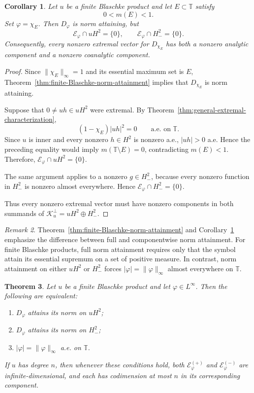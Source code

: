 \documentclass[12pt]{amsart}
\newtheorem{theorem}{Theorem}[section]
\newtheorem{corollary}[theorem]{Corollary}
\theoremstyle{definition}
\theoremstyle{remark}
\newtheorem{remark}[theorem]{Remark}
\def \T{\mathbb{T}}
\newcommand{\cle}{\mathcal{E}}
\newcommand{\clk}{\mathcal{K}}
\newcommand{\vp}{\varphi}
\numberwithin{equation}{section}
\begin{document}
\begin{corollary}\label{cor:characteristic-mixed-extremals}
Let $u$ be a finite Blaschke product and let $E\subset\T$ satisfy
\[
0<m(E)<1.
\]
Set $\vp=\chi_E$. Then $D_\vp$ is norm attaining, but
\[
\cle_\vp\cap uH^2=\{0\},\qquad \cle_\vp\cap H^2_{-}=\{0\}.
\]
Consequently, every nonzero extremal vector for $D_{\chi_E}$ has both
a nonzero analytic component and a nonzero coanalytic component.
\end{corollary}

\begin{proof}
Since $\|\chi_E\|_\infty=1$ and its essential maximum set is $E$, Theorem~\ref{thm:finite-Blaschke-norm-attainment} implies that
$D_{\chi_E}$ is norm attaining.
	
Suppose that $0\neq uh\in uH^2$ were extremal. By Theorem~\ref{thm:general-extremal-characterization},
\[
(1-\chi_E)|uh|^2=0
\qquad\text{a.e. on }\T.
\]
Since $u$ is inner and every nonzero $h\in H^2$ is nonzero a.e., $|uh|>0$ a.e. Hence the preceding equality would imply $m(\T\setminus E)=0$, contradicting $m(E)<1$. Therefore,
$\cle_\vp\cap uH^2=\{0\}$.
	
The same argument applies to a nonzero $g\in H^2_{-}$, because every
nonzero function in $H^2_{-}$ is nonzero almost everywhere. Hence
$\cle_\vp\cap H^2_{-}=\{0\}$.
	
Thus every nonzero extremal vector must have nonzero components in
both summands of $\clk_u^\perp=uH^2\oplus H^2_{-}$.
\end{proof}

\begin{remark}
Theorem~\ref{thm:finite-Blaschke-norm-attainment} and
Corollary~\ref{cor:characteristic-mixed-extremals} emphasize the
difference between full and componentwise norm attainment. For finite
Blaschke products, full norm attainment requires only that the symbol attain its essential supremum on a set of positive measure. In
contrast, norm attainment on either $uH^2$ or $H^2_{-}$ forces $|\vp|=\|\vp\|_\infty$ almost everywhere on $\T$.
\end{remark}



\begin{theorem}\label{thm:finite-Blaschke-componentwise}
Let $u$ be a finite Blaschke product and let $\vp\in L^\infty$.
Then the following are equivalent:
\begin{enumerate}
\item $D_\vp$ attains its norm on $uH^2$;
\item $D_\vp$ attains its norm on $H^2_{-}$;
\item $|\vp|=\|\vp\|_\infty$ a.e. on $\T$.

\end{enumerate}
If $u$ has degree $n$, then whenever these conditions hold, both $\cle_\vp^{(+)}$ and $\cle_\vp^{(-)}$ are infinite-dimensional,
and each has codimension at most $n$ in its corresponding component.
\end{theorem}
\end{document}
